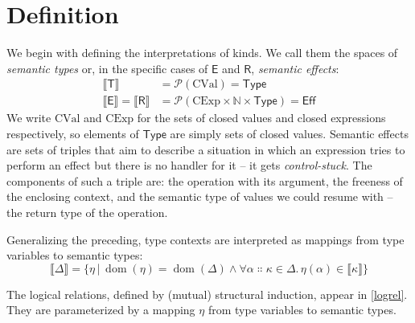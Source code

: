 \documentclass[a4paper, 11pt,titlepage, openright, twoside]{report}
\newcommand{\kT}{\mathsf{T}}
\newcommand{\kE}{\mathsf{E}}
\newcommand{\kR}{\mathsf{R}}
\DeclareMathOperator{\dom}{dom}
\newcommand{\+}{\enspace}
\begin{document}
\section{Definition}

We begin with defining the interpretations of kinds.
We call them the spaces of \textit{semantic types} or,
in the specific cases of $\kE$ and $\kR$, \textit{semantic effects}:
\begin{align*}
	⟦\kT⟧ &= \mathcal{P}(\textrm{CVal}) = \mathsf{Type}\\
	⟦\kE⟧ = ⟦\kR⟧ &= \mathcal{P}(\textrm{CExp}×ℕ×\mathsf{Type}) = \mathsf{Eff}
\end{align*}
We write $\textrm{CVal}$ and $\textrm{CExp}$ for the sets of closed values and closed expressions respectively, so
elements of $\mathsf{Type}$ are simply sets of closed values.
Semantic effects are sets of triples that aim to describe a situation
in which an expression tries to perform an effect but there is no handler for it – it gets {\em control-stuck}.
The components of such a triple are:
the operation with its argument,
the freeness of the enclosing context,
and the semantic type of values we could resume with – the return type of the operation.

Generalizing the preceding,
type contexts are interpreted as mappings from type variables to semantic types:%
$$⟦Δ⟧ = \{ η │ \dom(η) = \dom(Δ) ∧ ∀α∷κ∈Δ.\,η(α) ∈ ⟦κ⟧ \}$$

The logical relations, defined by (mutual) structural induction, appear in \cref{logrel}.
They are parameterized by a mapping $η$ from type variables to
semantic types.
\end{document}
